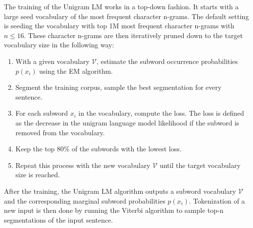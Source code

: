 The training of the Unigram LM works in a top-down fashion. It starts with a large seed vocabulary of the most frequent character n-grams. The default setting is seeding the vocabulary with top 1M most frequent character n-grams with $n \leq 16$. These character n-grams are then iteratively pruned down to the target vocabulary size in the following way:

\begin{enumerate}
    \item With a given vocabulary $\mathcal{V}$, estimate the subword occurrence probabilities $p(x_i)$ using the EM algorithm.
    \item Segment the training corpus, sample the best segmentation for every sentence.
    \item For each subword $x_i$ in the vocabulary, compute the loss. The loss is defined as the decrease in the unigram language model likelihood if the subword is removed from the vocabulary.
    \item Keep the top 80\% of the subwords with the lowest loss.
    \item Repeat this process with the new vocabulary $\mathcal{V}$ until the target vocabulary size is reached.
\end{enumerate}

After the training, the Unigram LM algorithm outputs a subword vocabulary $\mathcal{V}$ and the corresponding marginal subword probabilities $p(x_i)$. Tokenization of a new input is then done by running the Viterbi algorithm to sample top-n segmentations of the input sentence. 








